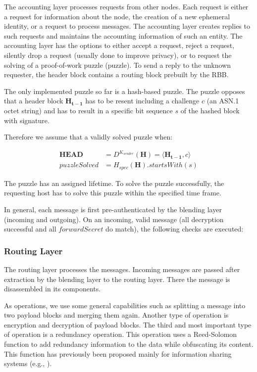 \documentclass[10pt,journal,compsoc,twocolumn,twoside]{IEEEtran}
\begin{document}
The accounting layer processes requests from other nodes. Each request is either a request for information about the node, the creation of a new ephemeral identity, or a request to process messages. The accounting layer creates replies to such requests and maintains the accounting information of such an entity. The accounting layer has the options to either accept a request, reject a request, silently drop a request (usually done to improve privacy), or to request the solving of a proof-of-work puzzle (puzzle). To send a reply to the unknown requester, the header block contains a routing block prebuilt by the RBB.

The only implemented puzzle so far is a hash-based puzzle. The puzzle opposes that a header block $\mathbf{H_{t-1}}$ has to be resent including a challenge $c$ (an ASN.1 octet string) and has to result in a specific bit sequence $s$ of the hashed block with signature.

Therefore we assume that a validly solved puzzle when:

\begin{eqnarray}
\mathbf{HEAD}&= D^{K_{sender}}\left(\mathbf{H}\right) = \langle \mathbf{H_{t-1}}, c\rangle\\
puzzleSolved&= H_{spec}(\mathbf{H}).startsWith(s)
\end{eqnarray}

The puzzle has an assigned lifetime. To solve the puzzle successfully, the requesting host has to solve this puzzle within the specified time frame. 

In general, each message is first pre-authenticated by the blending layer (incoming and outgoing). On an incoming, valid message (all decryption successful and all $forwardSecret$ do match), the following checks are executed:



\subsubsection{Routing Layer}
The routing layer processes the messages. Incoming messages are passed after extraction by the blending layer to the routing layer. There the message is disassembled in its components.

As operations, we use some general capabilities such as splitting a message into two payload blocks and merging them again. Another type of operation is encryption and decryption of payload blocks. The third and most important type of operation is a redundancy operation. This operation uses a Reed-Solomon\cite{reed1960polynomial} function to add redundancy information to the data while obfuscating its content. This function has previously been proposed mainly for information sharing systems (e.g., \cite{mceliece1981sharing}).
\end{document}
